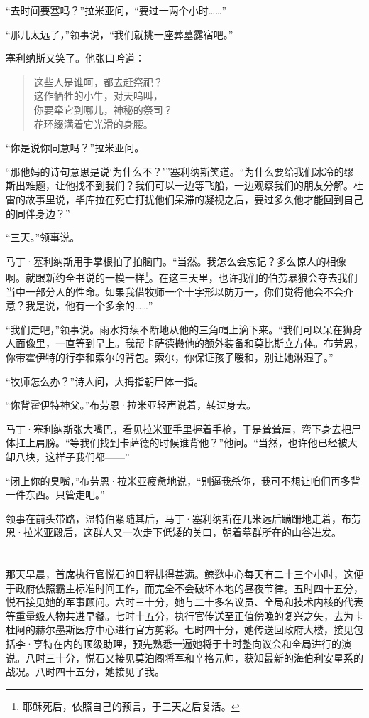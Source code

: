 \documentclass[AutoFakeBold=true]{book}
\begin{document}
``去时间要塞吗？''拉米亚问，``要过一两个小时……''

``那儿太远了，''领事说，``我们就挑一座葬墓露宿吧。''

塞利纳斯又笑了。他张口吟道：

\begin{quote}
	{\kaishu 这些人是谁呵，都去赶祭祀？\\
	这作牺牲的小牛，对天呜叫，\\
	你要牵它到哪儿，神秘的祭司？\\
	花环缀满着它光滑的身腰。}
\end{quote}

``你是说你同意吗？''拉米亚问。

``那他妈的诗句意思是说`为什么不？'''塞利纳斯笑道。``为什么要给我们冰冷的缪斯出难题，让他找不到我们？我们可以一边等飞船，一边观察我们的朋友分解。杜雷的故事里说，毕库拉在死亡打扰他们呆滞的凝视之后，要过多久他才能回到自己的同伴身边？''

``三天。''领事说。

马丁·塞利纳斯用手掌根拍了拍脑门。``当然。我怎么会忘记？多么惊人的相像啊。就跟新约全书说的一模一样\footnote{耶稣死后，依照自己的预言，于三天之后复活。}。在这三天里，也许我们的伯劳暴狼会夺去我们当中一部分人的性命。如果我借牧师一个十字形以防万一，你们觉得他会不会介意？我是说，他有一个多余的……''

``我们走吧，''领事说。雨水持续不断地从他的三角帽上滴下来。``我们可以呆在狮身人面像里，一直等到早上。我帮卡萨德搬他的额外装备和莫比斯立方体。布劳恩，你带霍伊特的行李和索尔的背包。索尔，你保证孩子暖和，别让她淋湿了。''

``牧师怎么办？''诗人问，大拇指朝尸体一指。

``你背霍伊特神父。''布劳恩·拉米亚轻声说着，转过身去。

马丁·塞利纳斯张大嘴巴，看见拉米亚手里握着手枪，于是耸耸肩，弯下身去把尸体扛上肩膀。``等我们找到卡萨德的时候谁背他？''他问。``当然，也许他已经被大卸八块，这样子我们都——''

``闭上你的臭嘴，''布劳恩·拉米亚疲惫地说，``别逼我杀你，我可不想让咱们再多背一件东西。只管走吧。''

领事在前头带路，温特伯紧随其后，马丁·塞利纳斯在几米远后蹒跚地走着，布劳恩·拉米亚殿后，这群人又一次走下低矮的关口，朝着墓群所在的山谷进发。

\chapter{}

那天早晨，首席执行官悦石的日程排得甚满。鲸逖中心每天有二十三个小时，这便于政府依照霸主标准时间工作，而完全不会破坏本地的昼夜节律。五时四十五分，悦石接见她的军事顾问。六时三十分，她与二十多名议员、全局和技术内核的代表等重量级人物共进早餐。七时十五分，执行官传送至正值傍晚的复兴之矢，去为卡杜阿的赫尔墨斯医疗中心进行官方剪彩。七时四十分，她传送回政府大楼，接见包括李·亨特在内的顶级助理，预先熟悉一遍她将于十时整向议会和全局进行的演说。八时三十分，悦石又接见莫泊阁将军和辛格元帅，获知最新的海伯利安星系的战况。八时四十五分，她接见了我。
\end{document}
